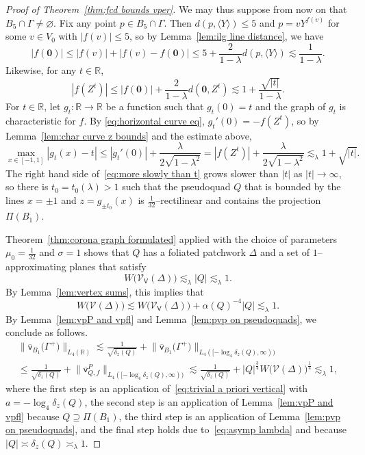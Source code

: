 \documentclass[11pt,reqno]{amsart}
\newcommand{\R}{\mathbb{R}}
\newcommand{\cV}{\mathcal{V}}
\newcommand{\0}{\mathbf{0}}
\renewcommand{\1}{\mathbf 1}
\newcommand{\from}{\colon}
\renewcommand{\supset}{\supseteq}
\renewcommand{\le}{\leqslant}
\renewcommand{\emptyset}{\varnothing}
\theoremstyle{remark}
\newcommand{\vpfl}[1]{{\overline{\mathsf{v}}_{\!#1}}}
\newcommand{\vpP}[1]{{\overline{\mathsf{v}}^{P}_{\!#1}}}
\newcommand{\cVv}{{\mathcal{V}_{\mathsf{V}}}}
\begin{document}
\begin{proof}[{Proof of Theorem~\ref{thm:fcd bounds vper}}]
We may thus suppose from now on that $B_{5}\cap \Gamma\neq \emptyset$.  Fix any point $p\in B_{5}\cap \Gamma$.  Then $d(p,\langle Y\rangle)\le 5$ and $p=vY^{f(v)}$ for some $v\in V_0$ with $|f(v)|\le 5$, so by Lemma~\ref{lem:ilg line distance}, we have
  $$|f(\mathbf{0})|\le |f(v)| + |f(v) - f(\mathbf{0})| \le 5 + \frac{2}{1-\lambda} d(p, \langle Y\rangle) \lesssim \frac{1}{1-\lambda}.$$
  Likewise, for any $t\in \R$,
  $$|f(Z^t)|\le |f(\mathbf{0})|+\frac{2}{1-\lambda}d(\mathbf{0},Z^t)\lesssim  1+\frac{\sqrt{|t|}}{1-\lambda}.$$
  For $t\in \R$, let $g_t\from \R\to \R$ be a function such that $g_t(0)=t$ and the graph of $g_t$ is characteristic for $f$. By \eqref{eq:horizontal curve eq}, $g_t'(0)=-f(Z^t)$, so by Lemma~\ref{lem:char curve z bounds} and the estimate above,
\begin{equation}\label{eq:more slowly than t}\max_{x\in [-1,1]} |g_t(x)-t|\le |g_t'(0)| + \frac{\lambda}{2\sqrt{1-\lambda^2}} =
  |f(Z^{t})|+\frac{\lambda}{2\sqrt{1-\lambda^2}}\lesssim_\lambda 1+\sqrt{|t|}.\end{equation}
The right hand side of~\eqref{eq:more slowly than t} grows slower than $|t|$ as $|t|\to \infty$, so there is $t_0=t_0(\lambda) > 1$ such that the pseudoquad $Q$ that is bounded by the lines $x=\pm1$ and $z=g_{\pm t_0}(x)$ is $\frac{1}{32}$--rectilinear and contains the projection $\Pi(B_1)$.

Theorem~\ref{thm:corona graph formulated} applied with the choice of parameters $\mu_0=\frac{1}{32}$ and $\sigma=1$ shows that $Q$ has a foliated patchwork $\Delta$ and a set of $1$--approximating planes that satisfy
$$
  W\big(\cVv(\Delta)\big)\lesssim_{\lambda} |Q|\lesssim_{\lambda} 1.
$$
  By Lemma~\ref{lem:vertex sums}, this implies that
    \begin{equation}\label{eq:asymp lambda}
    W\big(\cV(\Delta)\big)\lesssim W\big(\cVv(\Delta)\big)+\alpha(Q)^{-4}|Q|\lesssim_{\lambda} 1.
    \end{equation}
  By Lemma~\ref{lem:vpP and vpfl} and Lemma~\ref{lem:pvp on pseudoquads}, we conclude as follows.
  \begin{multline*}\big\|\vpfl{B_1}\big(\Gamma^+\big)\big\|_{L_4(\R)}\lesssim \frac{1}{\sqrt{\delta_z(Q)}}+\big\|\vpfl{B_1}\big(\Gamma^+\big)\big\|_{L_4([-\log_4\delta_z(Q) ,\infty))}\\
  \le   \frac{1}{\sqrt{\delta_z(Q)}}+ \big\|\vpP{Q,f}\big\|_{L_4([-\log_4\delta_z(Q) ,\infty))}\lesssim   \frac{1}{\sqrt{\delta_z(Q)}}+ |Q|^{\frac{3}{4}}W\big(\cV(\Delta)\big)^{\frac{1}{4}}\lesssim_{\lambda}1,\end{multline*}
  where the first step is an application of~\eqref{eq:trivial a priori vertical} with $a=-\log_4\delta_z(Q)$, the second step is an application of Lemma~\ref{lem:vpP and vpfl} because $Q\supset \Pi(B_1)$, the third step is an application of Lemma~\ref{lem:pvp on pseudoquads}, and the final step holds due to~\eqref{eq:asymp lambda} and because $|Q|\asymp \delta_z(Q)\asymp_\lambda 1$.
\end{proof}
\end{document}
